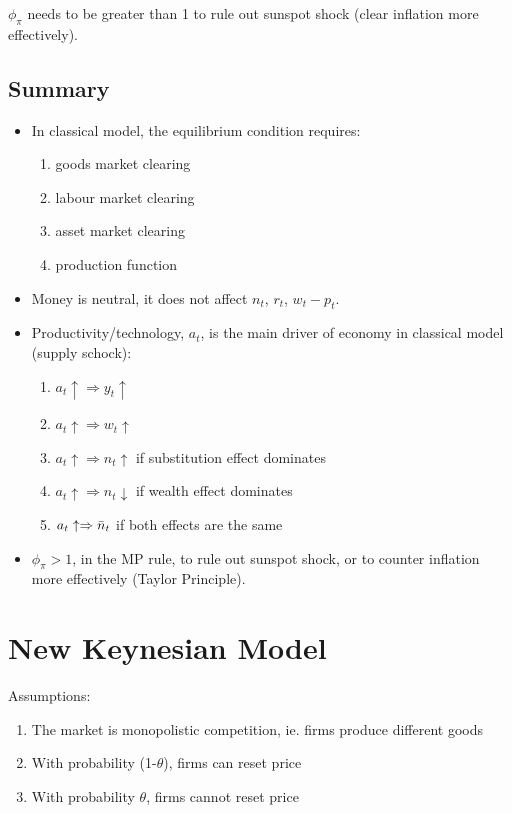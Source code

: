 \documentclass{article}
\begin{document}
$\phi_\pi$ needs to be greater than 1 to rule out sunspot shock (clear inflation more effectively).\\

\pagebreak

\subsection{Summary}
\begin{itemize}
    \item In classical model, the equilibrium condition requires:
    \begin{enumerate}
        \item goods market clearing
        \item labour market clearing
        \item asset market clearing
        \item production function
    \end{enumerate}

    \item Money is neutral, it does not affect $n_t$, $r_t$, $w_t - p_t$.
    \item Productivity/technology, $a_t$, is the main driver of economy in classical model (supply schock):
    \begin{enumerate}
        \item $a_t\uparrow \Rightarrow y_t\uparrow$
        \item $a_t \uparrow \Rightarrow w_t\uparrow$
        \item $a_t\uparrow \Rightarrow n_t\uparrow$ if substitution effect dominates
        \item $a_t\uparrow \Rightarrow n_t\downarrow$ if wealth effect dominates
        \item $a_t\uparrow \Rightarrow \Bar{n}_t$ if both effects are the same
    \end{enumerate}

    \item $\phi_\pi > 1$, in the MP rule, to rule out sunspot shock, or to counter inflation more effectively (Taylor Principle).
\end{itemize}

\pagebreak

\section{New Keynesian Model}
Assumptions:
\begin{enumerate}
    \item The market is monopolistic competition, ie. firms produce different goods
    \item With probability (1-$\theta$), firms can reset price
    \item With probability $\theta$, firms cannot reset price
\end{enumerate}
\end{document}
